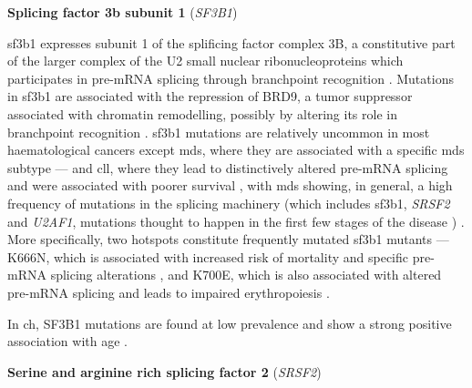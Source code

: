 \noindent \textbf{Splicing factor 3b subunit 1} (\textit{SF3B1})

\Ac{sf3b1} expresses subunit 1 of the splificing factor complex 3B, a constitutive part of the larger complex of the U2 small nuclear ribonucleoproteins which participates in pre-mRNA splicing \cite{Fica2013-vn,Kramer1995-mw,Isono2001-yf} through branchpoint recognition \cite{Gozani1998-ox}. Mutations in \ac{sf3b1} are associated with the repression of BRD9, a tumor suppressor associated with chromatin remodelling, possibly by altering its role in branchpoint recognition \cite{Inoue2019-ra}. \ac{sf3b1} mutations are relatively uncommon in most haematological cancers except \ac{mds}, where they are associated with a specific \ac{mds} subtype \cite{Papaemmanuil2011-nr,Hellstrom_Lindberg2015-zs} --- and \ac{cll}, where they lead to distinctively altered pre-mRNA splicing and were associated with poorer survival \cite{Wang2011-wu,Quesada2011-xc}, with \ac{mds} showing, in general, a high frequency of mutations in the splicing machinery (which includes \ac{sf3b1}, \textit{SRSF2} and \textit{U2AF1}, mutations thought to happen in the first few stages of the disease \cite{Haferlach2014-bh,Papaemmanuil2013-yt,Nagata2019-hn}) \cite{Yoshida2011-zp}. More specifically, two hotspots constitute frequently mutated \ac{sf3b1} mutants --- K666N, which is associated with increased risk of mortality and specific pre-mRNA splicing alterations \cite{Dalton2020-mg}, and K700E, which is also associated with altered pre-mRNA splicing and leads to impaired erythropoiesis \cite{Obeng2016-bw}.

In \ac{ch}, SF3B1 mutations are found at low prevalence \cite{Jaiswal2014-rl, Bolton2020-ct, Genovese2014-eu,Xie2014-np,Zink2017-zi,McKerrell2015-rl} and show a strong positive association with age \cite{Bolton2020-ct,Xie2014-np,McKerrell2015-rl}. 

\noindent \textbf{Serine and arginine rich splicing factor 2} (\textit{SRSF2})

